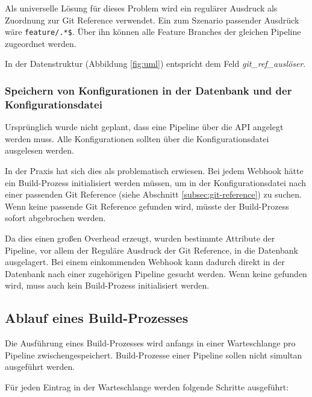 Als universelle Lösung für dieses Problem wird ein regulärer Ausdruck als Zuordnung zur Git Reference verwendet. Ein zum Szenario passender Ausdrück wäre \texttt{feature/.*\$}. Über ihn können alle Feature Branches der gleichen Pipeline zugeordnet werden.

In der Datenstruktur (Abbildung \ref{fig:uml}) entspricht dem Feld \emph{git\_ref\_auslöser}.

\subsubsection{Speichern von Konfigurationen in der Datenbank und der Konfigurationsdatei}

Ursprünglich wurde nicht geplant, dass eine Pipeline über die API angelegt werden muss. Alle Konfigurationen sollten über die Konfigurationsdatei ausgelesen werden.

In der Praxis hat sich dies als problematisch erwiesen. Bei jedem Webhook hätte ein Build-Prozess initialisiert werden müssen, um in der Konfigurationsdatei nach einer passenden Git Reference (siehe Abschnitt \ref{subsec:git-reference}) zu suchen. Wenn keine passende Git Reference gefunden wird, müsste der Build-Prozess sofort abgebrochen werden.

Da dies einen großen Overhead erzeugt, wurden bestimmte Attribute der Pipeline, vor allem der Reguläre Ausdruck der Git Reference, in die Datenbank ausgelagert. Bei einem einkommenden Webhook kann dadurch direkt in der Datenbank nach einer zugehörigen Pipeline gesucht werden. Wenn keine gefunden wird, muss auch kein Build-Prozess initialisiert werden.

\subsection{Ablauf eines Build-Prozesses}
\label{subsec:ablauf-build}

Die Ausführung eines Build-Prozesses wird anfangs in einer Warteschlange pro Pipeline zwischengespeichert. Build-Prozesse einer Pipeline sollen nicht simultan ausgeführt werden.

Für jeden Eintrag in der Warteschlange werden folgende Schritte ausgeführt:


